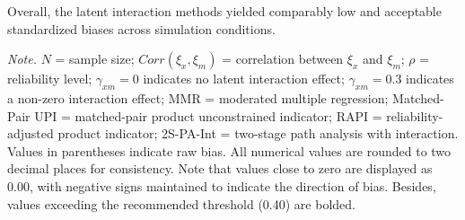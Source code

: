 \documentclass[
  man]{apa6}
\newenvironment{lltable}{\begin{landscape}\centering\begin{ThreePartTable}}{\end{ThreePartTable}\end{landscape}}
\begin{document}
Overall, the latent interaction methods yielded comparably low and acceptable standardized biases across simulation conditions.

\begin{lltable}

\begin{TableNotes}[para]
\normalsize{\textit{Note.} $\textit{N}$ = sample size; $Corr(\xi_{x}, \xi_{m})$ = correlation between $\xi_{x}$ and $\xi_{m}$; $\rho$ = reliability level; $\gamma_{xm} = 0$ indicates no latent interaction effect; $\gamma_{xm} = 0.3$ indicates a non-zero interaction effect; MMR = moderated multiple regression; Matched-Pair UPI = matched-pair product unconstrained indicator; RAPI = reliability-adjusted product indicator; 2S-PA-Int = two-stage path analysis with interaction. Values in parentheses indicate raw bias. All numerical values are rounded to two decimal places for consistency. Note that values close to zero are displayed as 0.00, with negative signs maintained to indicate the direction of bias. Besides, values exceeding the recommended threshold (0.40) are bolded.}
\end{TableNotes}

\tiny{

}
\end{lltable}
\end{document}
